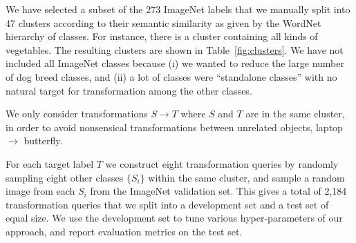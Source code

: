 We have selected a subset of the 273 ImageNet labels that we manually split into 47 
clusters according to their semantic similarity as given by the WordNet hierarchy of classes.
For instance, there is a cluster 
containing all kinds of vegetables. 
The resulting clusters are shown in Table~\ref{fig:clusters}. 
 We have not included all ImageNet classes 
because (i) we wanted to reduce the large number of dog breed classes, and (ii) a 
lot of classes were ``standalone classes'' with no natural target for transformation 
among the other classes.

%
We only consider  transformations  $S \rightarrow T$ where $S$ and $T$ are in the same 
cluster, in order to avoid nonsensical transformations between unrelated objects, \eg 
laptop $\rightarrow$ butterfly.

For each target label $T$ we construct eight transformation queries by randomly 
sampling eight other classes $\{S_i\}$ within the same cluster, and sample a random 
image from each $S_i$ from the ImageNet validation set.
This gives  a total of 2,184 transformation queries that we split into a development
 set and a test set of equal size.
We use the development set to tune various hyper-parameters of our approach, and 
report evaluation metrics on the test set.


